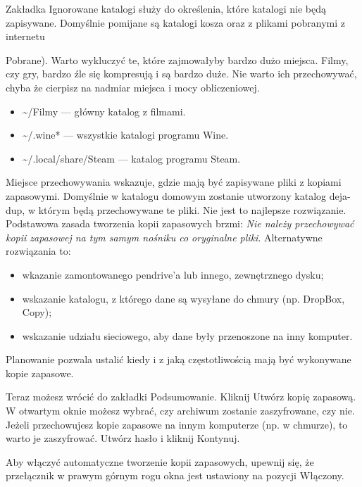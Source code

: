 Zakładka \textcolor{ubuntu_orange}{Ignorowane katalogi} służy do określenia, które katalogi nie będą zapisywane. Domyślnie pomijane są katalogi kosza oraz z plikami pobranymi z internetu {Pobrane). Warto wykluczyć te, które zajmowałyby bardzo dużo miejsca. Filmy, czy gry, bardzo źle się kompresują i są bardzo duże. Nie warto ich przechowywać, chyba że cierpisz na nadmiar miejsca i mocy obliczeniowej.
\begin{itemize}
\item \textcolor{ubuntu_orange}{\textasciitilde /Filmy} --- główny katalog z filmami.
\item \textcolor{ubuntu_orange}{\textasciitilde /.wine*} --- wszystkie katalogi programu Wine.
\item \textcolor{ubuntu_orange}{\textasciitilde /.local/share/Steam} --- katalog programu Steam.
\end{itemize}

\textcolor{ubuntu_orange}{Miejsce przechowywania} wskazuje, gdzie mają być zapisywane pliki z kopiami zapasowymi.  Domyślnie w katalogu domowym zostanie utworzony katalog \textcolor{ubuntu_orange}{deja-dup}, w którym będą przechowywane te pliki. Nie jest to najlepsze rozwiązanie. Podstawowa zasada tworzenia kopii zapasowych brzmi: \emph{Nie należy przechowywać kopii zapasowej na tym samym nośniku co oryginalne pliki}. Alternatywne rozwiązania to:
\begin{itemize}
\item wkazanie zamontowanego pendrive'a lub innego, zewnętrznego dysku;
\item wskazanie katalogu, z którego dane są wysyłane do chmury (np. DropBox, Copy);
\item wskazanie udziału sieciowego, aby dane były przenoszone na inny komputer.
\end{itemize}

\textcolor{ubuntu_orange}{Planowanie} pozwala ustalić kiedy i z jaką częstotliwością mają być wykonywane kopie zapasowe.

Teraz możesz wrócić do zakładki \textcolor{ubuntu_orange}{Podsumowanie}. Kliknij \textcolor{ubuntu_orange}{Utwórz kopię zapasową}. W otwartym oknie możesz wybrać, czy archiwum zostanie zaszyfrowane, czy nie. Jeżeli przechowujesz kopie zapasowe na innym komputerze (np. w chmurze), to warto je zaszyfrować. Utwórz hasło i kliknij \textcolor{ubuntu_orange}{Kontynuj}.

Aby włączyć automatyczne tworzenie kopii zapasowych, upewnij się, że przełącznik w prawym górnym rogu okna jest ustawiony na pozycji \textcolor{ubuntu_orange}{Włączony}.

}

